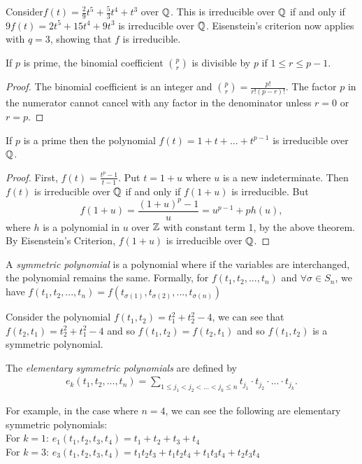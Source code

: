 \begin{example}
Consider$
f(t) = \frac{2}{9} t^5 + \frac{5}{3} t^4 + t^3 
$ over $\mathbb Q$. This is irreducible over $\mathbb Q$ if and only if $
9f(t) = 2t^5 + 15t^4 + 9t^3
$
is irreducible over $\mathbb Q$. Eisenstein's criterion now applies with $q = 3$, showing that $f$ is irreducible.
\end{example}

\begin{theorem}
If $p$ is prime, the binomial coefficient $\binom{p}{r}$ is divisible by $p$ if $1 \le r \le p-1$.
\end{theorem}

\begin{proof}
The binomial coefficient is an integer and $\binom{p}{r} = \frac{p!}{r!(p-r)!}$. The factor $p$ in the numerator cannot cancel with any factor in the denominator unless $r=0$ or $r=p$.
\end{proof}

\begin{theorem}\label{thm:irreducible-prime-polynomial}
    If $p$ is a prime then the polynomial
    $
    f(t) = 1 + t + ... + t^{p-1}
    $
    is irreducible over $\mathbb Q$.
\end{theorem}

\begin{proof}
First, $f(t) = \frac{t^p - 1}{t - 1}$. Put $t = 1 + u$ where $u$ is a new indeterminate. Then $f(t)$ is irreducible over $\mathbb Q$ if and only if $f(1+u)$ is irreducible. But
$$
f(1+u) = \frac{(1+u)^p - 1}{u}  = u^{p-1} + ph(u),
$$
where $h$ is a polynomial in $u$ over $\mathbb Z$ with constant term 1, by the above theorem. By Eisenstein's Criterion, $f(1+u)$ is irreducible over $\mathbb Q$.
\end{proof}

\begin{definition}
    A \textit{symmetric polynomial} is a polynomial where if the variables are interchanged, the polynomial remains the same.
    Formally, for $f(t_1,t_2,...,t_n)$ and $\forall \sigma \in S_n$, we have $f(t_1,t_2,...,t_n) = f(t_{\sigma(1)},t_{\sigma(2)},...,t_{\sigma(n)})$
\end{definition}

\begin{example}
    Consider the polynomial 
    $f(t_1,t_2)=t_1^2+t_2^2-4$, we can see that $f(t_2,t_1)=t_2^2+t_1^2-4$ and so $f(t_1,t_2)=f(t_2,t_1)$ and so $f(t_1,t_2)$ is a symmetric polynomial.
\end{example}

\begin{definition}
    The \textit{elementary symmetric polynomials} are defined by 
    \begin{align*}
    e_k(t_1,t_2,...,t_n) = \sum_{1\leq j_1<j_2<...<j_k\leq n} t_{j_1}\cdot t_{j_2} \cdot ... \cdot t_{j_k}.
    \end{align*}
\end{definition}

\begin{example}
    For example, in the case where $n=4$, we can see the following are elementary symmetric polynomials:
    \\For $k=1$: $e_1(t_1,t_2,t_3,t_4) = t_1 + t_2 + t_3 + t_4$
    \\For $k=3$: $e_3(t_1,t_2,t_3,t_4) = t_1t_2t_3+t_1t_2t_4+t_1t_3t_4+t_2t_3t_4$
\end{example}